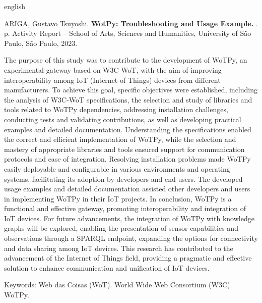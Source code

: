 % 
% 
\begin{resumo}[Abstract]
\begin{otherlanguage*}{english}

% 
%
%
%
\begin{flushleft}
ARIGA, Gustavo Tsuyoshi. \textbf{WotPy: Troubleshooting and Usage Example.} \imprimirdata. \pageref{LastPage} p. Activity Report – School of Arts, Sciences and Humanities, University of São Paulo, São Paulo, 2023. 
\end{flushleft}

The purpose of this study was to contribute to the development of WoTPy, an experimental gateway based on W3C-WoT, with the aim of improving interoperability among IoT (Internet of Things) devices from different manufacturers. To achieve this goal, specific objectives were established, including the analysis of W3C-WoT specifications, the selection and study of libraries and tools related to WoTPy dependencies, addressing installation challenges, conducting tests and validating contributions, as well as developing practical examples and detailed documentation. Understanding the specifications enabled the correct and efficient implementation of WoTPy, while the selection and mastery of appropriate libraries and tools ensured support for communication protocols and ease of integration. Resolving installation problems made WoTPy easily deployable and configurable in various environments and operating systems, facilitating its adoption by developers and end users. The developed usage examples and detailed documentation assisted other developers and users in implementing WoTPy in their IoT projects. In conclusion, WoTPy is a functional and effective gateway, promoting interoperability and integration of IoT devices. For future advancements, the integration of WoTPy with knowledge graphs will be explored, enabling the presentation of sensor capabilities and observations through a SPARQL endpoint, expanding the options for connectivity and data sharing among IoT devices. This research has contributed to the advancement of the Internet of Things field, providing a pragmatic and effective solution to enhance communication and unification of IoT devices.

Keywords: Web das Coisas (WoT). World Wide Web Consortium (W3C). WoTPy.
\end{otherlanguage*}
\end{resumo}